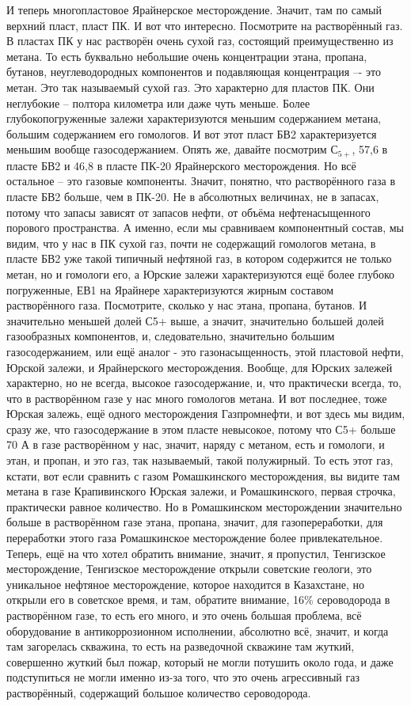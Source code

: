 \documentclass[main.tex]{subfiles}
\begin{document}
И теперь многопластовое Ярайнерское месторождение.
Значит, там по самый верхний пласт, пласт ПК.
И вот что интересно.
Посмотрите на растворённый газ.
В пластах ПК у нас растворён очень сухой газ, состоящий преимущественно из метана.
То есть буквально небольшие очень концентрации этана, пропана, бутанов, неуглеводородных компонентов и подавляющая концентрация –- это метан.
Это так называемый сухой газ.
Это характерно для пластов ПК.
Они неглубокие -- полтора километра или даже чуть меньше.
Более глубокопогруженные залежи характеризуются меньшим содержанием метана, большим содержанием его гомологов.
И вот этот пласт БВ2 характеризуется меньшим вообще газосодержанием.
Опять же, давайте посмотрим $С_{5+}$, 57,6 в пласте БВ2 и 46,8 в пласте ПК-20 Ярайнерского месторождения.
Но всё остальное – это газовые компоненты.
Значит, понятно, что растворённого газа в пласте БВ2 больше, чем в ПК-20.
Не в абсолютных величинах, не в запасах, потому что запасы зависят от запасов нефти, от объёма нефтенасыщенного порового пространства.
А именно, если мы сравниваем компонентный состав, мы видим, что у нас в ПК сухой газ, почти не содержащий гомологов метана, в пласте БВ2 уже такой типичный нефтяной газ, в котором содержится не только метан, но и гомологи его, а Юрские залежи характеризуются ещё более глубоко погруженные, ЕВ1 на Ярайнере характеризуются жирным составом растворённого газа.
Посмотрите, сколько у нас этана, пропана, бутанов.
И значительно меньшей долей С5+ выше, а значит, значительно большей долей газообразных компонентов, и, следовательно, значительно большим газосодержанием, или ещё аналог - это газонасыщенность, этой пластовой нефти, Юрской залежи, и Ярайнерского месторождения.
Вообще, для Юрских залежей характерно, но не всегда, высокое газосодержание, и, что практически всегда, то, что в растворённом газе у нас много гомологов метана.
И вот последнее, тоже Юрская залежь, ещё одного месторождения Газпромнефти, и вот здесь мы видим, сразу же, что газосодержание в этом пласте невысокое, потому что С5+ больше 70%
А в газе растворённом у нас, значит, наряду с метаном, есть и гомологи, и этан, и пропан, и это газ, так называемый, такой полужирный.
То есть этот газ, кстати, вот если сравнить с газом Ромашкинского месторождения, вы видите там метана в газе Крапивинского Юрская залежи, и Ромашкинского, первая строчка, практически равное количество.
Но в Ромашкинском месторождении значительно больше в растворённом газе этана, пропана, значит, для газопереработки, для переработки этого газа Ромашкинское месторождение более привлекательное.
Теперь, ещё на что хотел обратить внимание, значит, я пропустил, Тенгизское месторождение, Тенгизское месторождение открыли советские геологи, это уникальное нефтяное месторождение, которое находится в Казахстане, но открыли его в советское время, и там, обратите внимание, 16\% сероводорода в растворённом газе, то есть его много, и это очень большая проблема, всё оборудование в антикоррозионном исполнении, абсолютно всё, значит, и когда там загорелась скважина, то есть на разведочной скважине там жуткий, совершенно жуткий был пожар, который не могли потушить около года, и даже подступиться не могли именно из-за того, что это очень агрессивный газ растворённый, содержащий большое количество сероводорода.
\end{document}
